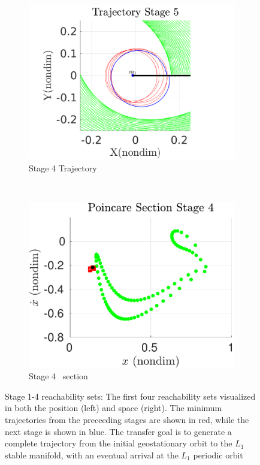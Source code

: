 \documentclass[smallcondensed]{svjour3}
\begin{document}
\begin{figure}[htbp]
    \begin{subfigure}[htbp]{0.5\textwidth} 
        \includegraphics[width=\textwidth, keepaspectratio]{figures/geo_transfer/stage5_trajectory_zoom.pdf} 
        \caption{Stage 4 Trajectory~\label{fig:stage4_trajecotry_zoom}} 
    \end{subfigure}~
    \begin{subfigure}[htbp]{0.5\textwidth} 
        \includegraphics[width=\textwidth, keepaspectratio]{figures/geo_transfer/stage4_poincare.pdf} 
        \caption{Stage 4 \Poincare~section \label{fig:stage4_poincare}} 
    \end{subfigure}   
    \caption{Stage 1-4 reachability sets: The first four reachability sets visualized in both the position (left) and \Poincare space (right).
        The minimum trajectories from the preceeding stages are shown in red, while the next stage is shown in blue.
    The transfer goal is to generate a complete trajectory from the initial geostationary orbit to the \( L_1 \) stable manifold, with an eventual arrival at the \( L_1 \) periodic orbit~\label{fig:stage1to4_reachability}}
\end{figure}
\end{document}
